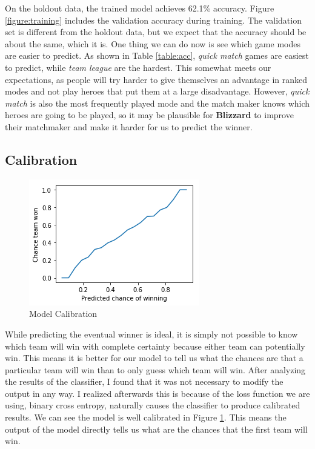 \documentclass[twoside,twocolumn]{article}
\begin{document}
On the holdout data, the trained model achieves 62.1\% accuracy.  Figure \ref{figure:training} includes the validation accuracy during training.  The validation set is different from the holdout data, but we expect that the accuracy should be about the same, which it is.  One thing we can do now is see which game modes are easier to predict.  As shown in Table \ref{table:acc}, \textit{quick match} games are easiest to predict, while \textit{team league} are the hardest.  This somewhat meets our expectations, as people will try harder to give themselves an advantage in ranked modes and not play heroes that put them at a large disadvantage.  However, \textit{quick match} is also the most frequently played mode and the match maker knows which heroes are going to be played, so it may be plausible for \textbf{Blizzard} to improve their matchmaker and make it harder for us to predict the winner.

\subsection{Calibration}

\begin{figure}[h]
\caption{Model Calibration}
\label{figure:calib}
\centering
\includegraphics[width=\linewidth]{calibration}
\end{figure}

While predicting the eventual winner is ideal, it is simply not possible to know which team will win with complete certainty because either team can potentially win.  This means it is better for our model to tell us what the chances are that a particular team will win than to only guess which team will win.  After analyzing the results of the classifier, I found that it was not necessary to modify the output in any way.  I realized afterwards this is because of the loss function we are using, binary cross entropy, naturally causes the classifier to produce calibrated results.  We can see the model is well calibrated in Figure \ref{figure:calib}.  This means the output of the model directly tells us what are the chances that the first team will win.
\end{document}
